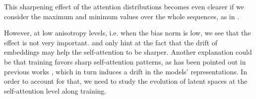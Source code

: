 This sharpening effect of the attention distributions becomes even clearer if we consider the maximum and minimum values over the whole sequences, as in .

However, at low anisotropy levels, i.e. when the bias norm is low, we see that the effect is not very important.  and  only hint at the fact that the drift of embeddings may help the self-attention to be sharper. Another explanation could be that training favors sharp self-attention patterns, as has been pointed out in previous works \citep{clark-etal-2019-bert}, which in turn induces a drift in the models' representations. In order to account for that, we need to study the evolution of latent spaces at the self-attention level along training.

